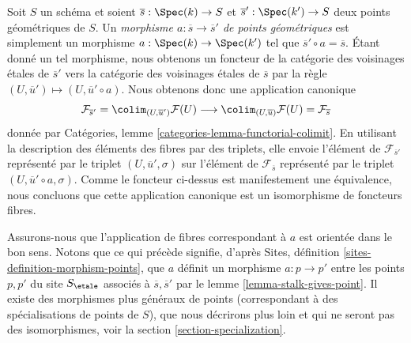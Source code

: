 \begin{remark}
\label{remark-map-stalks}
Soit $S$ un sch\'ema et soient $\overline{s} : \Spec(k) \to S$
et $\overline{s}' : \Spec(k') \to S$ deux points g\'eom\'etriques de
$S$. Un {\it morphisme $a : \overline{s} \to \overline{s}'$ de points g\'eom\'etriques}
est simplement un morphisme $a : \Spec(k) \to \Spec(k')$ tel que
$\overline{s}' \circ a = \overline{s}$. \'Etant donn\'e un tel morphisme, nous obtenons
un foncteur de la cat\'egorie des voisinages \'etales de $\overline{s}'$
vers la cat\'egorie des voisinages \'etales de $\overline{s}$ par la r\`egle
$(U, \overline{u}') \mapsto (U, \overline{u}' \circ a)$. Nous obtenons donc
une application canonique
$$
\mathcal{F}_{\overline{s}'}
=
\colim_{(U, \overline{u}')} \mathcal{F}(U)
\longrightarrow
\colim_{(U, \overline{u})} \mathcal{F}(U)
=
\mathcal{F}_{\overline{s}}
$$
donn\'ee par Catégories, lemme \ref{categories-lemma-functorial-colimit}. En utilisant la
description des \'el\'ements des fibres par des triplets, elle envoie l'\'el\'ement de
$\mathcal{F}_{\overline{s}'}$ repr\'esent\'e par le triplet
$(U, \overline{u}', \sigma)$ sur l'\'el\'ement de $\mathcal{F}_{\overline{s}}$
repr\'esent\'e par le triplet $(U, \overline{u}' \circ a, \sigma)$.
Comme le foncteur ci-dessus est manifestement une \'equivalence, nous concluons que cette
application canonique est un isomorphisme de foncteurs fibres.

\medskip\noindent
Assurons-nous que l'application de fibres correspondant \`a $a$ est orient\'ee
dans le bon sens. Notons que ce qui pr\'ec\`ede signifie, d'apr\`es
Sites, définition \ref{sites-definition-morphism-points},
que $a$ d\'efinit un morphisme $a : p \to p'$ entre les points $p, p'$ du
site $S_\etale$ associ\'es \`a $\overline{s}, \overline{s}'$ par le
lemme \ref{lemma-stalk-gives-point}. Il existe des morphismes plus g\'en\'eraux de
points (correspondant \`a des sp\'ecialisations de points de $S$), que nous
d\'ecrirons plus loin et qui ne seront pas des isomorphismes, voir la section
\ref{section-specialization}.
\end{remark}

